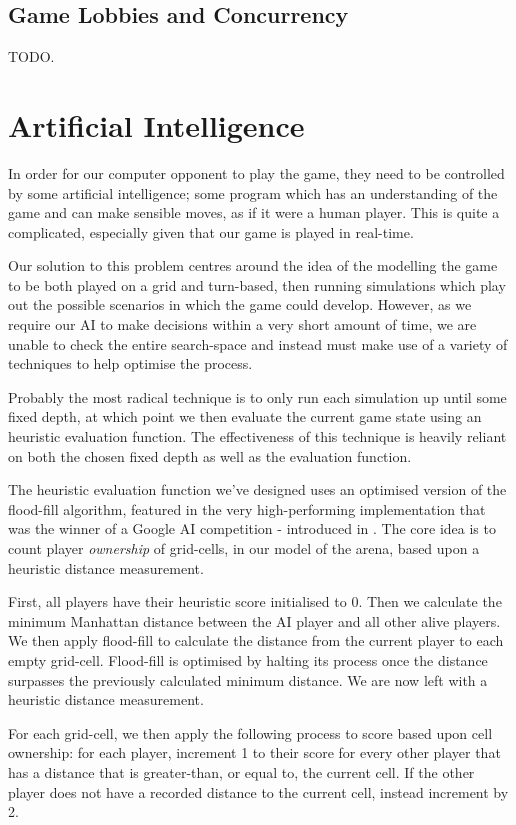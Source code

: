 \documentclass{standalone}
\begin{document}
		\subsection{Game Lobbies and Concurrency} \label{sec:lobbyConcurrency}
			TODO.


	\section{Artificial Intelligence} \label{sec:design-ai}
		In order for our computer opponent to play the game, they need to be controlled by some artificial intelligence; some program which has an understanding of the game and can make sensible moves, as if it were a human player. This is quite a complicated, especially given that our game is played in real-time.

		Our solution to this problem centres around the idea of the modelling the game to be both played on a grid and turn-based, then running simulations which play out the possible scenarios in which the game could develop. However, as we require our AI to make decisions within a very short amount of time, we are unable to check the entire search-space and instead must make use of a variety of techniques to help optimise the process.

		Probably the most radical technique is to only run each simulation up until some fixed depth, at which point we then evaluate the current game state using an heuristic evaluation function. The effectiveness of this technique is heavily reliant on both the chosen fixed depth as well as the evaluation function.

		The heuristic evaluation function we've designed uses an optimised version of the flood-fill algorithm, featured in the very high-performing implementation that was the winner of a Google AI competition - introduced in . The core idea is to count player \emph{ownership} of grid-cells, in our model of the arena, based upon a heuristic distance measurement.

		First, all players have their heuristic score initialised to 0. Then we calculate the minimum Manhattan distance between the AI player and all other alive players. We then apply flood-fill to calculate the distance from the current player to each empty grid-cell. Flood-fill is optimised by halting its process once the distance surpasses the previously calculated minimum distance. We are now left with a heuristic distance measurement.

		For each grid-cell, we then apply the following process to score based upon cell ownership: for each player, increment 1 to their score for every other player that has a distance that is greater-than, or equal to, the current cell. If the other player does not have a recorded distance to the current cell, instead increment by 2.
\end{document}

